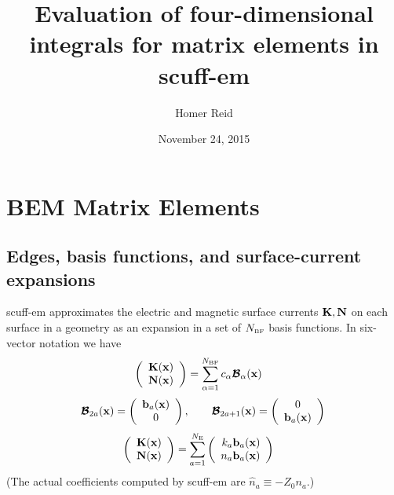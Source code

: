 \documentclass[letterpaper]{article}
\title {Evaluation of four-dimensional integrals for
        matrix elements in {\sc scuff-em}}
\author {Homer Reid}
\date {November 24, 2015}
\begin{document}
\pagestyle{myheadings}
\maketitle 

\tableofcontents

\newpage
\section{BEM Matrix Elements}

\subsection{Edges, basis functions, and surface-current expansions}

{\sc scuff-em} approximates the electric and magnetic surface currents
$\mathbf{K}, \mathbf{N}$ on each surface in a geometry as an expansion in
a set of $N_{\hbox{\tiny{BF}}}$ basis functions. In six-vector notation we have
\begin{align*}
   \left(\begin{array}{c} \mathbf{K}(\mathbf{x}) \\ \mathbf{N}(\mathbf{x}) \end{array}\right)
&= \sum_{\alpha=1}^{N_{\hbox{\tiny{BF}}}} c_{\alpha} \boldsymbol{\mathcal{B}}_{\alpha}(\mathbf{x})
\end{align*}
$$
\boldsymbol{\mathcal{B}}_{2a}(\mathbf{x})=
 \left(\begin{array}{c} \mathbf{b}_a(\mathbf{x}) \\ 0 \end{array}\right),
\qquad
\boldsymbol{\mathcal{B}}_{2a+1}(\mathbf{x})=
 \left(\begin{array}{c} 0 \\ \mathbf{b}_a(\mathbf{x}) \end{array}\right) \\
$$
\begin{align*}
  \left(\begin{array}{c} \mathbf{K}(\mathbf{x}) \\ \mathbf{N}(\mathbf{x}) \end{array}\right)
&= \sum_{a=1}^{N_{\hbox{\tiny{E}}}}
  \left(
  \begin{array}{r}      k_a \mathbf{b}_a (\mathbf{x}) \\
                        n_a \mathbf{b}_a (\mathbf{x}) 
  \end{array}\right)
\end{align*}
(The actual coefficients computed by {\sc scuff-em} are
$\hat{n}_a \equiv -Z_0 n_a$.)
\end{document}
